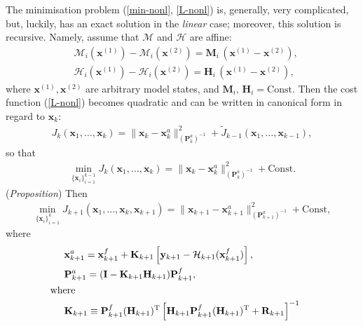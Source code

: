 \documentclass[11pt]{report}
\newcommand{\mb} {\mathbf}
\newcommand{\T}{^{\tiny \mathrm T}}
\begin{document}
The minimisation problem (\ref{min-nonl}, \ref{L-nonl}) is, generally, very complicated, but, luckily, has an exact solution in the \emph{linear} case; moreover, this solution is recursive.
Namely, assume that $\mathcal M$ and $\mathcal H$ are affine:
\begin{subequations}
  \label{lin}
  \begin{align}
    \label{lin-M}
    &\mathcal M_i(\mb x^{(1)}) - \mathcal M_i(\mb x^{(2)}) = \mb M_i \, (\mb x^{(1)} - \mb x^{(2)}),\\
    \label{lin-H}
    &\mathcal H_i(\mb x^{(1)}) - \mathcal H_i(\mb x^{(2)}) = \mb H_i \, (\mb x^{(1)} - \mb x^{(2)}),
  \end{align}
\end{subequations}
where $\mb x^{(1)}, \mb x^{(2)}$ are arbitrary model states, and $\mb M_i,\, \mb H_i = \mathrm{Const}$.
Then the cost function (\ref{L-nonl}) becomes quadratic and can be written in canonical form in regard to $\mb x_k$:
\begin{align*}
   J_k(\mb x_1, \dots, \mb x_k) = \|\mb x_k - \mb x_k^a\|^2_{(\mb P_{k}^a)^{-1}} + \tilde{{J}}_{k-1}(\mb x_1,\dots,\mb x_{k-1}),
\end{align*}
so that
\begin{align}
  \label{min-xk}
  \underset {\{\mb x_i\}_{i = 1}^{k - 1}}{\min} J_k(\mb x_1, \dots, \mb x_k) = \|\mb x_k - \mb x_k^a\|^2_{(\mb P_{k}^a)^{-1}} + \mathrm{Const}.
\end{align}
(\emph{Proposition}) Then
\begin{align}
  \label{min-xkp1}
    \underset {\{\mb x_i\}_{i = 1}^{k}}{\min} J_{k+1}(\mb x_1, \dots, \mb x_k, \mb x_{k+1}) = \|\mb x_{k+1} - \mb x_{k+1}^a\|^2_{(\mb P_{k+1}^a)^{-1}} + \mathrm{Const},
\end{align}
where
\begin{subequations}
  \label{kf-an}
  \begin{align}
    \label{kf-an-x}
    & \mb x_{k+1}^a = \mb x_{k+1}^f + \mb K_{k+1} \left [\mb y_{k+1} - \mathcal H_{k+1}(\mb x_{k+1}^f) \right ],\\
    \label{kf-an-P}
    & \mb P_{k+1}^a = (\mb I - \mb K_{k+1} \mb H_{k+1}) \mb P_{k+1}^f,\\
    \nonumber
    & \hspace{-0.5cm} \text{where}\\
    \label{kf-K}
    & \mb K_{k+1} \equiv \mb P^f_{k+1} (\mb H_{k+1})\T \left [\mb H_{k+1} \mb P_{k+1}^f (\mb H_{k+1})\T + \mb R_{k+1} \right ]^{-1}
  \end{align}
\end{subequations}
\end{document}
